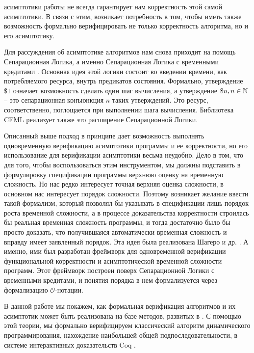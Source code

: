 асимптотики работы не всегда гарантирует нам корректность этой самой асимптотики.
В связи с этим, возникает потребность в том, чтобы иметь также возможность формально верифицировать не только корректность алгоритма, но
и его асимптотику.
\par
Для рассуждения об асимптотике алгоритмов нам снова приходит на помощь Сепарационная Логика, а именно Сепарационная Логика с временными
кредитами \cite{SepLogicTime}. Основная идея этой логики состоит во введении времени, как потребляемого ресурса,
внутрь предикатов состояния. Формально, утверждение $\$1$ означает возможность сделать один шаг вычисления, а утверждение
$\$n, n \in \mathbb{N}$ -- это сепарационная конъюнкция $n$ таких утверждений. Это ресурс, соответственно,
поглощается при выполнении шага вычисления. Библиотека CFML \cite{CFML} реализует также это расширение Сепарационной Логики.
\par
Описанный выше подход в принципе дает возможность выполнять одновременную верификацию асимптотики программы и ее корректности, но
его использование для верификации асимптотики весьма неудобно. Дело в том, что для того, чтобы воспользоваться этим инструментом, мы
должны подставить в формулировку спецификации программы верхнюю оценку на временную сложность. Но нас редко интересует точная верхняя
оценка сложности, в основном нас интересует порядок сложности. Поэтому возникает желание ввести такой формализм, который позволял бы
указывать в спецификации лишь порядок роста временной сложности, а в процессе доказательства корректности
строилась бы реальная временная сложность программы, и тогда достаточно было бы просто доказать, что получившаяся автоматически временная
сложность и вправду имеет заявленный порядок. Эта идея была реализована Шагеро и др. \cite{base_article}. А именно, ими был разработан
фреймворк для одновременной верификации функциональной корректности и асимптотической временной сложности программ. Этот фреймворк построен
поверх Сепарационной Логики с временными кредитами, и понятия порядка в нем формализуется через формализацию $\mathcal{O}$-нотации.
\par
В данной работе мы покажем, как формальная верификация алгоритмов и их асимптотик может быть реализована на базе методов, развитых в \cite{base_article}.
С помощью этой теории, мы формально верифицируем классический алгоритм динамического программирования,
нахождение наибольшей общей подпоследовательности,
в системе интерактивных доказательств Coq \cite{the_coq_development_team_2021_4501022}.